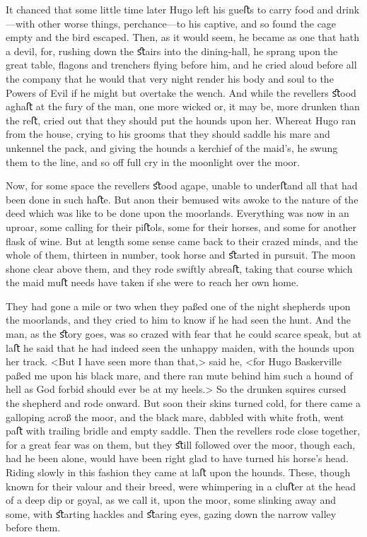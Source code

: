 It chanced that some little time later Hugo left his gueﬅs to carry food and drink—with other worse things, perchance—to his captive, and so found the cage empty and the bird escaped. Then, as it would seem, he became as one that hath a devil, for, rushing down the ﬆairs into the dining-hall, he sprang upon the great table, ﬂagons and trenchers ﬂying before him, and he cried aloud before all the company that he would that very night render his body and soul to the Powers of Evil if he might but overtake the wench. And while the revellers ﬆood aghaﬅ at the fury of the man, one more wicked or, it may be, more drunken than the reﬅ, cried out that they should put the hounds upon her. Whereat Hugo ran from the house, crying to his grooms that they should saddle his mare and unkennel the pack, and giving the hounds a kerchief of the maid's, he swung them to the line, and so oﬀ full cry in the moonlight over the moor.

Now, for some space the revellers ﬆood agape, unable to underﬅand all that had been done in such haﬅe. But anon their bemused wits awoke to the nature of the deed which was like to be done upon the moorlands. Everything was now in an uproar, some calling for their piﬅols, some for their horses, and some for another ﬂask of wine. But at length some sense came back to their crazed minds, and the whole of them, thirteen in number, took horse and ﬆarted in pursuit. The moon shone clear above them, and they rode swiftly abreaﬅ, taking that course which the maid muﬅ needs have taken if she were to reach her own home.

They had gone a mile or two when they paßed one of the night shepherds upon the moorlands, and they cried to him to know if he had seen the hunt. And the man, as the ﬆory goes, was so crazed with fear that he could scarce speak, but at laﬅ he said that he had indeed seen the unhappy maiden, with the hounds upon her track. <But I have seen more than that,> said he, <for Hugo Baskerville paßed me upon his black mare, and there ran mute behind him such a hound of hell as God forbid should ever be at my heels.> So the drunken squires cursed the shepherd and rode onward. But soon their skins turned cold, for there came a galloping acroß the moor, and the black mare, dabbled with white froth, went paﬅ with trailing bridle and empty saddle. Then the revellers rode close together, for a great fear was on them, but they ﬆill followed over the moor, though each, had he been alone, would have been right glad to have turned his horse's head. Riding slowly in this fashion they came at laﬅ upon the hounds. These, though known for their valour and their breed, were whimpering in a cluﬅer at the head of a deep dip or goyal, as we call it, upon the moor, some slinking away and some, with ﬆarting hackles and ﬆaring eyes, gazing down the narrow valley before them.


